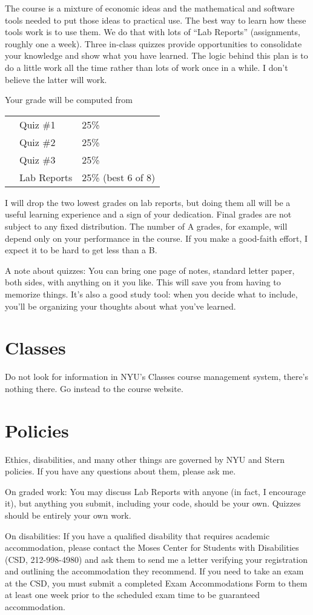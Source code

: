 \documentclass[11pt]{article}
\begin{document}
The course is a mixture of economic ideas and
the mathematical and software tools needed to put those ideas to practical use.
The best way to learn how these tools work is to use them.
We do that with lots of ``Lab Reports'' (assignments, roughly one a week).
Three in-class quizzes provide opportunities to consolidate your knowledge
and show what you have learned.
The logic behind this plan is to do a little work all the time rather than lots of
work once in a while.
I don't believe the latter will work.

Your grade will be computed from
\begin{center}
\begin{tabular}{lll}
&Quiz \#1    &   25\% \\
&Quiz \#2    &   25\% \\
&Quiz \#3    &   25\% \\
\hspace*{0.2in}&Lab Reports  \hspace*{0.25in}    &   25\%  (best 6 of 8)
\end{tabular}
\end{center}
I will drop the two lowest grades on lab reports,
but doing them all will be a useful learning experience
and a sign of your dedication.
Final grades are not subject to any fixed distribution.
The number of A grades, for example,
will depend only on your performance in the course.
If you make a good-faith effort,
I expect it to be hard to get less than a B.

A note about quizzes:  You can bring one page of notes, standard letter paper,
both sides, with anything on it you like.
This will save you from having to memorize things.
It's also a good study tool:  when you decide what to include,
you'll be organizing your thoughts about what you've learned.


\section*{Classes}

Do not look for information in NYU's Classes course management system,
there's nothing there.
Go instead to the course website.


\section*{Policies}

Ethics, disabilities, and many other things are governed by NYU
and Stern policies.
If you have any questions about them, please ask me.

On graded work:
You may discuss Lab Reports with anyone (in fact, I encourage it),
but anything you submit, including your code, should be your own.
Quizzes should be entirely your own work.

On disabilities:
If you have a qualified disability that requires academic accommodation,
please contact the Moses Center for Students with Disabilities (CSD, 212-998-4980) and ask them to
send me a letter verifying your registration and outlining the accommodation they recommend.
If you need to take an exam at the CSD,
you must submit a completed Exam Accommodations Form to them
at least one week prior to the scheduled exam time to be guaranteed accommodation.
\end{document}
